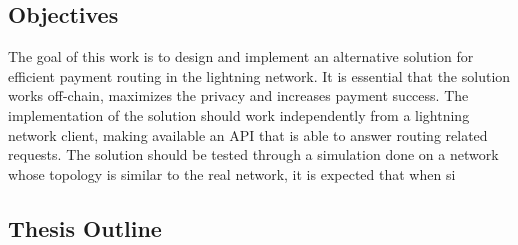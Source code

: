 \subsection{Objectives}
\label{ssec:objectives}

The goal of this work is to design and implement an alternative solution for efficient payment routing in the lightning network. It is essential that the solution works \gls{off-chain}, maximizes the privacy and increases payment success.
The implementation of the solution should work independently from a lightning network client, making available an API that is able to answer routing related requests.
The solution should be tested through a simulation done on a network whose topology is similar to the real network, it is expected that when si

\subsection{Thesis Outline}